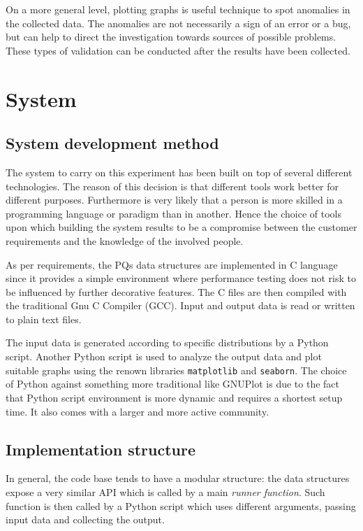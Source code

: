 \documentclass{article}
\begin{document}
On a more general level, plotting graphs is useful technique to spot anomalies in the collected data. The anomalies are not necessarily a sign of an error or a bug, but can help to direct the investigation towards sources of possible problems. These types of validation can be conducted after the results have been collected.

\pagebreak



\section{System}

\subsection{System development method}
The system to carry on this experiment has been built on top of several different technologies. The reason of this decision is that different tools work better for different purposes. Furthermore is very likely that a person is more skilled in a programming language or paradigm than in another. Hence the choice of tools upon which building the system results to be a compromise between the customer requirements and the knowledge of the involved people.

As per requirements, the PQs data structures are implemented in C language since it provides a simple environment where performance testing does not risk to be influenced by further decorative features. The C files are then compiled with the traditional Gnu C Compiler (GCC). Input and output data is read or written to plain text files.

The input data is generated according to specific distributions by a Python script. Another Python script is used to analyze the output data and plot suitable graphs using the renown libraries \texttt{matplotlib} and \texttt{seaborn}. The choice of Python against something more traditional like GNUPlot is due to the fact that Python script environment is more dynamic and requires a shortest setup time. It also comes with a larger and more active community.

\subsection{Implementation structure}
In general, the code base tends to have a modular structure: the data structures expose a very similar API which is called by a main \textit{runner function}. Such function is then called by a Python script which uses different arguments, passing input data and collecting the output.
\end{document}
